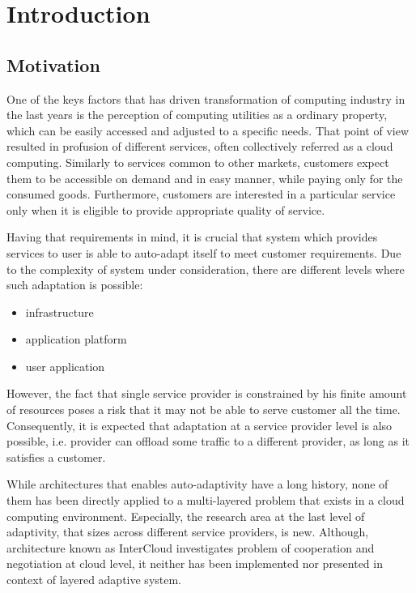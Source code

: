 \chapter{Introduction}

\section{Motivation}
One of the keys factors that has driven transformation of computing industry in the last years is the perception of computing utilities as a ordinary property, which can be easily accessed and adjusted to a specific needs. That point of view resulted in profusion of different services, often collectively referred as a cloud computing. Similarly to services common to other markets, customers expect them to be accessible on demand and in easy manner, while paying only for the consumed goods. Furthermore, customers are interested in a particular service only when it is eligible to provide appropriate quality of service.

Having that requirements in mind, it is crucial that system which provides services to user is able to auto-adapt itself to meet customer requirements. Due to the complexity of system under consideration, there are different levels where such adaptation is possible:
\begin{itemize}
	\item infrastructure
	\item application platform
	\item user application
\end{itemize} 
However, the fact that single service provider is constrained by his finite amount of resources poses a risk that it may not be able to serve customer all the time. Consequently, it is expected that adaptation at a service provider level is also possible, i.e. provider can offload some traffic to a different provider, as long as it satisfies a customer.

While architectures that enables auto-adaptivity have a long history, none of them has been directly applied to a multi-layered problem that exists in a cloud computing environment. Especially, the research area at the last level of adaptivity, that sizes across different service providers, is new. Although, architecture known as InterCloud investigates problem of cooperation and negotiation at cloud level, it neither has been implemented nor presented in context of layered adaptive system.


